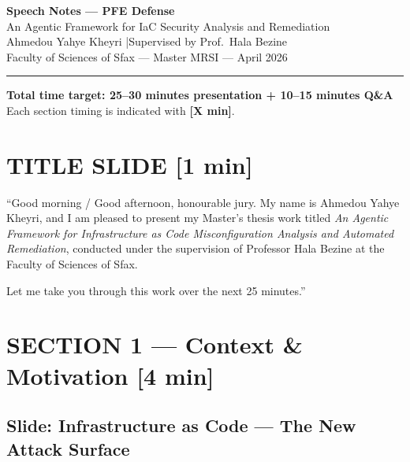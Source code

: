 \documentclass[12pt,a4paper]{article}
\newcommand{\timing}[1]{{\color{slidegold}\textbf{[#1]}}}
\begin{document}
\begin{center}
  {\Large\bfseries\color{slideblue} Speech Notes --- PFE Defense}\\[0.4em]
  {\large\color{slidegold} An Agentic Framework for IaC Security Analysis and Remediation}\\[0.3em]
  {\normalsize Ahmedou Yahye Kheyri \quad|\quad Supervised by Prof.\ Hala Bezine}\\[0.2em]
  {\normalsize Faculty of Sciences of Sfax --- Master MRSI --- April 2026}\\[0.5em]
  \rule{\linewidth}{1.5pt}
\end{center}

\noindent\textbf{Total time target: 25--30 minutes presentation + 10--15 minutes Q\&A}\\
Each section timing is indicated with \timing{X min}.

\section*{TITLE SLIDE \timing{1 min}}

\begin{saybox}
``Good morning / Good afternoon, honourable jury.
My name is Ahmedou Yahye Kheyri, and I am pleased to present my Master's thesis work titled
\textit{An Agentic Framework for Infrastructure as Code Misconfiguration Analysis and Automated Remediation},
conducted under the supervision of Professor Hala Bezine
at the Faculty of Sciences of Sfax.

Let me take you through this work over the next 25 minutes.''
\end{saybox}

\section{SECTION 1 --- Context \& Motivation \timing{4 min}}

\subsection{Slide: Infrastructure as Code --- The New Attack Surface}
\end{document}
